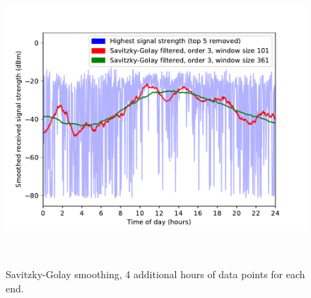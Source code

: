 \documentclass[a4paper, 11pt]{article}
\begin{document}
\begin{figure}[htbp]
\begin{minipage}[t]{0.45\textwidth}
\centering
\includegraphics[width=\textwidth]{savitzky_4hours}
\caption{Savitzky-Golay smoothing, 4 additional hours of data points for each end.}
\label{savitzky_4}
\end{minipage}\

\end{figure}
\end{document}
